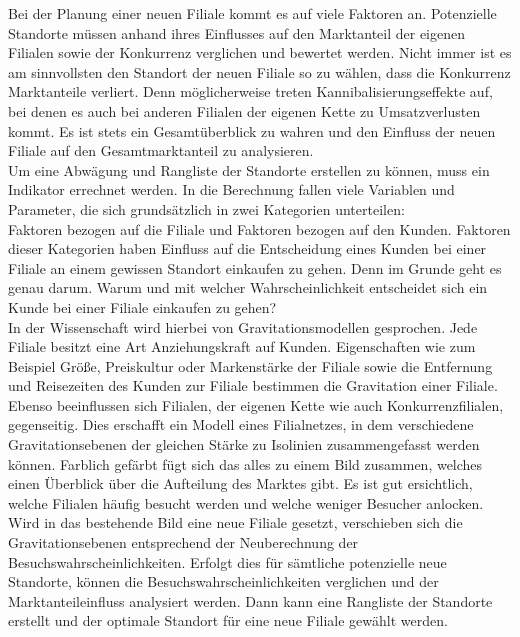 Bei der Planung einer neuen Filiale kommt es auf viele Faktoren an.
Potenzielle Standorte müssen anhand ihres Einflusses auf den Marktanteil der eigenen Filialen sowie der Konkurrenz verglichen und bewertet werden.
Nicht immer ist es am sinnvollsten den Standort der neuen Filiale so zu wählen, dass die Konkurrenz Marktanteile verliert.
Denn möglicherweise treten Kannibalisierungseffekte auf, bei denen es auch bei anderen Filialen der eigenen Kette zu Umsatzverlusten kommt.
Es ist stets ein Gesamtüberblick zu wahren und den Einfluss der neuen Filiale auf den Gesamtmarktanteil zu analysieren.\\
Um eine Abwägung und Rangliste der Standorte erstellen zu können, muss ein Indikator errechnet werden.
In die Berechnung fallen viele Variablen und Parameter, die sich grundsätzlich in zwei Kategorien unterteilen:\\
Faktoren bezogen auf die Filiale und Faktoren bezogen auf den Kunden.
Faktoren dieser Kategorien haben Einfluss auf die Entscheidung eines Kunden bei einer Filiale an einem gewissen Standort einkaufen zu gehen.
Denn im Grunde geht es genau darum.
Warum und mit welcher Wahrscheinlichkeit entscheidet sich ein Kunde bei einer Filiale einkaufen zu gehen?\\
In der Wissenschaft wird hierbei von Gravitationsmodellen gesprochen.
Jede Filiale besitzt eine Art Anziehungskraft auf Kunden.
Eigenschaften wie zum Beispiel Größe, Preiskultur oder Markenstärke der Filiale sowie die Entfernung und Reisezeiten des Kunden zur Filiale bestimmen die Gravitation einer Filiale.
Ebenso beeinflussen sich Filialen, der eigenen Kette wie auch Konkurrenzfilialen, gegenseitig.
Dies erschafft ein Modell eines Filialnetzes, in dem verschiedene Gravitationsebenen der gleichen Stärke zu Isolinien zusammengefasst werden können.
Farblich gefärbt fügt sich das alles zu einem Bild zusammen, welches einen Überblick über die Aufteilung des Marktes gibt.
Es ist gut ersichtlich, welche Filialen häufig besucht werden und welche weniger Besucher anlocken.
Wird in das bestehende Bild eine neue Filiale gesetzt, verschieben sich die Gravitationsebenen entsprechend der Neuberechnung der Besuchswahrscheinlichkeiten.
Erfolgt dies für sämtliche potenzielle neue Standorte,  können die Besuchswahrscheinlichkeiten verglichen und der Marktanteileinfluss analysiert werden.
Dann kann eine Rangliste der Standorte erstellt und der optimale Standort für eine neue Filiale gewählt werden.

